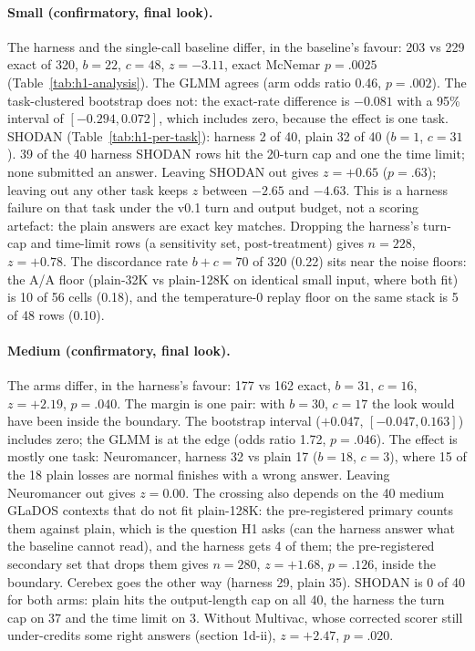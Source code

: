 \documentclass[11pt]{article}
\begin{document}
\paragraph{Small (confirmatory, final look).} The harness and the single-call baseline
differ, in the baseline's favour: 203 vs 229 exact of 320, $b=22$, $c=48$, $z=-3.11$,
exact McNemar $p=.0025$ (Table~\ref{tab:h1-analysis}). The GLMM agrees (arm odds ratio
0.46, $p=.002$). The task-clustered bootstrap does not: the exact-rate difference is
$-0.081$ with a 95\% interval of $[-0.294, 0.072]$, which includes zero, because the
effect is one task. SHODAN (Table~\ref{tab:h1-per-task}): harness 2 of 40, plain 32 of
40 ($b=1$, $c=31$). 39 of the 40 harness SHODAN rows hit the 20-turn cap and one the
time limit; none submitted an answer. Leaving SHODAN out gives $z=+0.65$ ($p=.63$);
leaving out any other task keeps $z$ between $-2.65$ and $-4.63$. This is a harness
failure on that task under the v0.1 turn and output budget, not a scoring artefact: the
plain answers are exact key matches. Dropping the harness's turn-cap and time-limit rows
(a sensitivity set, post-treatment) gives $n=228$, $z=+0.78$. The discordance rate
$b+c=70$ of 320 (0.22) sits near the noise floors: the A/A floor (plain-32K vs
plain-128K on identical small input, where both fit) is 10 of 56 cells (0.18), and the
temperature-0 replay floor on the same stack is 5 of 48 rows (0.10).

\paragraph{Medium (confirmatory, final look).} The arms differ, in the harness's favour:
177 vs 162 exact, $b=31$, $c=16$, $z=+2.19$, $p=.040$. The margin is one pair: with
$b=30$, $c=17$ the look would have been inside the boundary. The bootstrap interval
($+0.047$, $[-0.047, 0.163]$) includes zero; the GLMM is at the edge (odds ratio 1.72,
$p=.046$). The effect is mostly one task: Neuromancer, harness 32 vs plain 17 ($b=18$,
$c=3$), where 15 of the 18 plain losses are normal finishes with a wrong answer. Leaving
Neuromancer out gives $z=0.00$. The crossing also depends on the 40 medium GLaDOS
contexts that do not fit plain-128K: the pre-registered primary counts them against
plain, which is the question H1 asks (can the harness answer what the baseline cannot
read), and the harness gets 4 of them; the pre-registered secondary set that drops them
gives $n=280$, $z=+1.68$, $p=.126$, inside the boundary. Cerebex goes the other way
(harness 29, plain 35). SHODAN is 0 of 40 for both arms: plain hits the output-length
cap on all 40, the harness the turn cap on 37 and the time limit on 3. Without Multivac,
whose corrected scorer still under-credits some right answers (section 1d-ii),
$z=+2.47$, $p=.020$.
\end{document}
